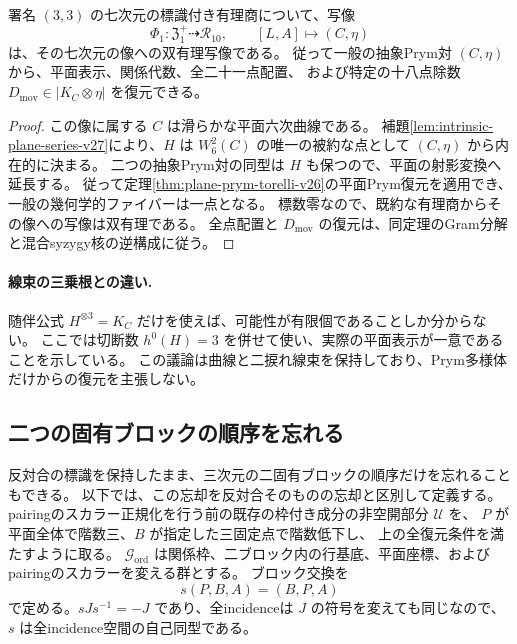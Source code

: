\begin{theorem}[抽象Prymデータによる六次の復元]
\label{thm:abstract-sextic-prym-torelli-v27}
署名 $(3,3)$ の七次元の標識付き有理商について、写像
\[
 \Phi_1:\mathfrak Z_1^+\dashrightarrow\mathcal R_{10},\qquad
 [L,A]\longmapsto(C,\eta)
\]
は、その七次元の像への双有理写像である。
従って一般の抽象Prym対 $(C,\eta)$ から、平面表示、関係代数、全二十一点配置、
および特定の十八点除数 $D_{\mathrm{mov}}\in|K_C\otimes\eta|$ を復元できる。
\end{theorem}

\begin{proof}
この像に属する $C$ は滑らかな平面六次曲線である。
補題\ref{lem:intrinsic-plane-series-v27}により、$H$ は
$W_6^2(C)$ の唯一の被約な点として $(C,\eta)$ から内在的に決まる。
二つの抽象Prym対の同型は $H$ も保つので、平面の射影変換へ延長する。
従って定理\ref{thm:plane-prym-torelli-v26}の平面Prym復元を適用でき、
一般の幾何学的ファイバーは一点となる。
標数零なので、既約な有理商からその像への写像は双有理である。
全点配置と $D_{\mathrm{mov}}$ の復元は、同定理のGram分解と混合syzygy核の逆構成に従う。
\end{proof}

\paragraph{線束の三乗根との違い.}
随伴公式 $H^{\otimes3}=K_C$ だけを使えば、可能性が有限個であることしか分からない。
ここでは切断数 $h^0(H)=3$ を併せて使い、実際の平面表示が一意であることを示している。
この議論は曲線と二捩れ線束を保持しており、Prym多様体だけからの復元を主張しない。

\subsection{二つの固有ブロックの順序を忘れる}
\label{subsec:unordered-blocks-v27}

反対合の標識を保持したまま、三次元の二固有ブロックの順序だけを忘れることもできる。
以下では、この忘却を反対合そのものの忘却と区別して定義する。
pairingのスカラー正規化を行う前の既存の枠付き成分の非空開部分 $\mathcal U$ を、
$P$ が平面全体で階数三、$B$ が指定した三固定点で階数低下し、
上の全復元条件を満たすように取る。
$\mathcal G_{\mathrm{ord}}$ は関係枠、二ブロック内の行基底、平面座標、およびpairingのスカラーを変える群とする。
ブロック交換を
\[
 s(P,B,A)=(B,P,A)
\]
で定める。$sJs^{-1}=-J$ であり、全incidenceは $J$ の符号を変えても同じなので、
$s$ は全incidence空間の自己同型である。

